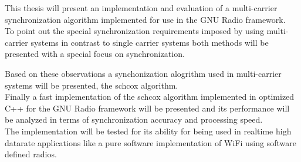 This thesis will present an implementation and evaluation of a
multi-carrier synchronization algorithm implemented for use
in the GNU Radio framework. \\

To point out the special synchronization requirements
imposed by using multi-carrier systems in contrast
to single carrier systems both methods will be presented
with a special focus on synchronization.

Based on these observations a synchonization alogrithm
used in multi-carrier systems will be presented,
the \gls{schcox} algorithm. \\

Finally a fast implementation of the \gls{schcox} algorithm
implemented in optimized C++ for the GNU Radio framework
will be presented and its performance will be analyzed
in terms of synchronization accuracy and processing speed. \\

The implementation will be tested for its ability
for being used in realtime high datarate applications
like a pure software implementation of WiFi using
software defined radios.
